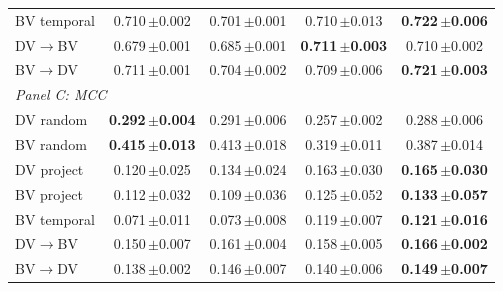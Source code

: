 \begin{table}[t]
\begin{tabular}{lcccc}
BV temporal & 0.710\,{\scriptsize$\pm$0.002} & 0.701\,{\scriptsize$\pm$0.001} & 0.710\,{\scriptsize$\pm$0.013} & \textbf{0.722\,{\scriptsize$\pm$0.006}} \\
DV$\to$BV & 0.679\,{\scriptsize$\pm$0.001} & 0.685\,{\scriptsize$\pm$0.001} & \textbf{0.711\,{\scriptsize$\pm$0.003}} & 0.710\,{\scriptsize$\pm$0.002} \\
BV$\to$DV & 0.711\,{\scriptsize$\pm$0.001} & 0.704\,{\scriptsize$\pm$0.002} & 0.709\,{\scriptsize$\pm$0.006} & \textbf{0.721\,{\scriptsize$\pm$0.003}} \\
\midrule
\multicolumn{5}{l}{\emph{Panel C: MCC}} \\
DV random & \textbf{0.292\,{\scriptsize$\pm$0.004}} & 0.291\,{\scriptsize$\pm$0.006} & 0.257\,{\scriptsize$\pm$0.002} & 0.288\,{\scriptsize$\pm$0.006} \\
BV random & \textbf{0.415\,{\scriptsize$\pm$0.013}} & 0.413\,{\scriptsize$\pm$0.018} & 0.319\,{\scriptsize$\pm$0.011} & 0.387\,{\scriptsize$\pm$0.014} \\
DV project & 0.120\,{\scriptsize$\pm$0.025} & 0.134\,{\scriptsize$\pm$0.024} & 0.163\,{\scriptsize$\pm$0.030} & \textbf{0.165\,{\scriptsize$\pm$0.030}} \\
BV project & 0.112\,{\scriptsize$\pm$0.032} & 0.109\,{\scriptsize$\pm$0.036} & 0.125\,{\scriptsize$\pm$0.052} & \textbf{0.133\,{\scriptsize$\pm$0.057}} \\
BV temporal & 0.071\,{\scriptsize$\pm$0.011} & 0.073\,{\scriptsize$\pm$0.008} & 0.119\,{\scriptsize$\pm$0.007} & \textbf{0.121\,{\scriptsize$\pm$0.016}} \\
DV$\to$BV & 0.150\,{\scriptsize$\pm$0.007} & 0.161\,{\scriptsize$\pm$0.004} & 0.158\,{\scriptsize$\pm$0.005} & \textbf{0.166\,{\scriptsize$\pm$0.002}} \\
BV$\to$DV & 0.138\,{\scriptsize$\pm$0.002} & 0.146\,{\scriptsize$\pm$0.007} & 0.140\,{\scriptsize$\pm$0.006} & \textbf{0.149\,{\scriptsize$\pm$0.007}} \\
\bottomrule
\end{tabular}
\end{table}
